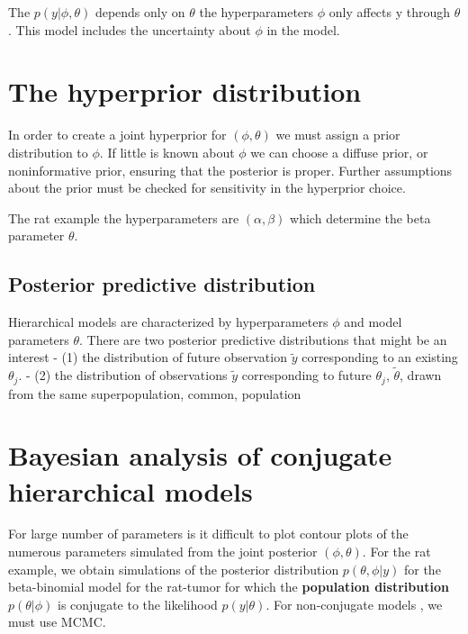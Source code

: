 \documentclass[
]{book}
\theoremstyle{definition}
\theoremstyle{definition}
\theoremstyle{definition}
\theoremstyle{definition}
\theoremstyle{remark}
\begin{document}
The \(p(y | \phi,\theta)\) depends only on \(\theta\) the hyperparameters \(\phi\) only affects y through \(\theta\). This model includes the uncertainty about \(\phi\) in the model.

\hypertarget{the-hyperprior-distribution}{%
\section*{The hyperprior distribution}\label{the-hyperprior-distribution}}

In order to create a joint hyperprior for \((\phi,\theta)\) we must assign a prior distribution to \(\phi\). If little is known about \(\phi\) we can choose a diffuse prior, or noninformative prior, ensuring that the posterior is proper. Further assumptions about the prior must be checked for sensitivity in the hyperprior choice.

The rat example the hyperparameters are \((\alpha,\beta)\) which determine the beta parameter \(\theta\).

\hypertarget{posterior-predictive-distribution-1}{%
\subsection*{Posterior predictive distribution}\label{posterior-predictive-distribution-1}}

Hierarchical models are characterized by hyperparameters \(\phi\) and model parameters \(\theta\). There are two posterior predictive distributions that might be an interest
- (1) the distribution of future observation \(\tilde{y}\) corresponding to an existing \(\theta_j\).
- (2) the distribution of observations \(\tilde{y}\) corresponding to future \(\theta_j\), \(\tilde{\theta}\), drawn from the same superpopulation, common, population

\hypertarget{bayesian-analysis-of-conjugate-hierarchical-models}{%
\section{Bayesian analysis of conjugate hierarchical models}\label{bayesian-analysis-of-conjugate-hierarchical-models}}

For large number of parameters is it difficult to plot contour plots of the numerous parameters simulated from the joint posterior \((\phi,\theta)\). For the rat example, we obtain simulations of the posterior distribution \(p(\theta,\phi | y)\) for the beta-binomial model for the rat-tumor for which the \textbf{population distribution} \(p(\theta|\phi)\) is conjugate to the likelihood \(p(y | \theta)\). For non-conjugate models , we must use MCMC.
\end{document}
